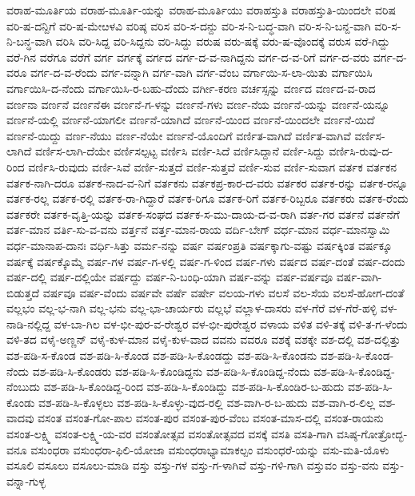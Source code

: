 ವರಾಹ-ಮೂರ್ತಿಯ
ವರಾಹ-ಮೂರ್ತಿ-ಯನ್ನು
ವರಾಹ-ಮೂರ್ತಿಯು
ವರಾಹಸ್ತುತಿ
ವರಾಹಸ್ತುತಿ-ಯಿಂದಲೇ
ವರಿಷ
ವರಿ-ಷ-ದನ್ದಿಗೆ
ವರಿ-ಷ-ಮೇೞಳವಿ
ವರಿಷ್ಠ
ವರಿಸ
ವರಿ-ಸ-ದನ್ದು
ವರಿ-ಸ-ನಿ-ಬದ್ಧ-ವಾಗಿ
ವರಿ-ಸ-ನಿ-ಬನ್ದ-ವಾಗಿ
ವರಿ-ಸ-ನಿ-ಬನ್ಧ-ವಾಗಿ
ವರಿಸಿ
ವರಿ-ಸಿದ್ದ
ವರಿ-ಸಿದ್ದನು
ವರಿ-ಸಿದ್ದು
ವರುಷ
ವರು-ಷಕ್ಕೆ
ವರು-ಷ-ವೊಂದಕ್ಕೆ
ವರುಸ
ವರೆ-ಗಿದ್ದು
ವರೆ-ಗಿನ
ವರೆಗೂ
ವರೆಗೆ
ವರ್ಗ
ವರ್ಗಕ್ಕೆ
ವರ್ಗದ
ವರ್ಗ-ದ-ವ-ನಾಗಿದ್ದನು
ವರ್ಗ-ದ-ವ-ರಿಗೆ
ವರ್ಗ-ದ-ವರು
ವರ್ಗ-ದ-ವರೂ
ವರ್ಗ-ದ-ವ-ರೆಂದು
ವರ್ಗ-ವನ್ನಾಗಿ
ವರ್ಗ-ವಾಗಿ
ವರ್ಗ-ವೆಂಬ
ವರ್ಗಾಯಿ-ಸ-ಲಾ-ಯಿತು
ವರ್ಗಾಯಿಸಿ
ವರ್ಗಾಯಿಸಿ-ದ-ನೆಂದು
ವರ್ಗಾಯಿಸಿ-ರ-ಬಹು-ದೆಂದು
ವರ್ಗೀ-ಕರಣ
ವರ್ಚಸ್ಸನ್ನು
ವರ್ಣದ
ವರ್ಣದ-ವ-ರಾದ
ವರ್ಣನಾ
ವರ್ಣನೆ
ವರ್ಣನೆಈ
ವರ್ಣನೆ-ಗ-ಳನ್ನು
ವರ್ಣನೆ-ಗಳು
ವರ್ಣ-ನೆಯ
ವರ್ಣನೆ-ಯನ್ನು
ವರ್ಣನೆ-ಯನ್ನೂ
ವರ್ಣನೆ-ಯಲ್ಲಿ
ವರ್ಣನೆ-ಯಾಗಲೀ
ವರ್ಣನೆ-ಯಾಗಿದೆ
ವರ್ಣನೆ-ಯಿಂದ
ವರ್ಣನೆ-ಯಿಂದಲೇ
ವರ್ಣನೆ-ಯಿದೆ
ವರ್ಣನೆ-ಯಿದ್ದು
ವರ್ಣ-ನೆಯು
ವರ್ಣ-ನೆಯೇ
ವರ್ಣನೆ-ಯೊಂದಿಗೆ
ವರ್ಣಿತ-ವಾಗಿದೆ
ವರ್ಣಿತ-ವಾಗಿವೆ
ವರ್ಣಿಸ-ಲಾಗಿದೆ
ವರ್ಣಿಸ-ಲಾಗಿ-ದೆಯೇ
ವರ್ಣಿಸಲ್ಪಟ್ಟ
ವರ್ಣಿಸಿ
ವರ್ಣಿ-ಸಿದೆ
ವರ್ಣಿಸಿದ್ದಾನೆ
ವರ್ಣಿ-ಸಿದ್ದು
ವರ್ಣಿಸಿ-ರುವು-ದ-ರಿಂದ
ವರ್ಣಿಸಿ-ರುವುದು
ವರ್ಣಿ-ಸಿವೆ
ವರ್ಣಿ-ಸುತ್ತದೆ
ವರ್ಣಿ-ಸುತ್ತವೆ
ವರ್ಣಿ-ಸುವ
ವರ್ಣಿ-ಸುವಾಗ
ವರ್ತಕ
ವರ್ತಕನ
ವರ್ತಕ-ನಾಗಿ-ದರೂ
ವರ್ತಕ-ನಾದ-ವ-ನಿಗೆ
ವರ್ತಕನು
ವರ್ತಕಪ್ರ-ಕಾರ-ದ-ವರು
ವರ್ತಕರ
ವರ್ತಕ-ರನ್ನು
ವರ್ತಕ-ರನ್ನೂ
ವರ್ತಕ-ರಲ್ಲ
ವರ್ತಕ-ರಲ್ಲಿ
ವರ್ತಕ-ರಾ-ಗಿದ್ದಾರೆ
ವರ್ತಕ-ರಿಗೂ
ವರ್ತಕ-ರಿಗೆ
ವರ್ತಕ-ರಿಬ್ಬರೂ
ವರ್ತಕರು
ವರ್ತಕ-ರೆಂದು
ವರ್ತಕರೇ
ವರ್ತಕ-ವೃತ್ತಿ-ಯನ್ನು
ವರ್ತಕ-ಸಂಘದ
ವರ್ತಕ-ಸ-ಮು-ದಾಯ-ದ-ವ-ರಾಗಿ
ವರ್ತ-ಗರ
ವರ್ತನೆ
ವರ್ತನೆಗೆ
ವರ್ತ-ಮಾನ
ವರ್ತಿ-ಸು-ವ-ವನು
ವರ್ತ್ತನೆ
ವರ್ತ್ತ-ಮಾನ-ರಾಯ
ವರ್ದಿ-ಬೇಗ್
ವರ್ಧ-ಮಾನ
ವರ್ಧ-ಮಾನಸ್ವಾಮಿ
ವರ್ಧ-ಮಾನಾಪ-ದಾನಃ
ವರ್ಧಿ-ಸಿತ್ತು
ವರ್ಮ-ನನ್ನು
ವರ್ಷ
ವರ್ಷಂಪ್ರತಿ
ವರ್ಷಕ್ಕಾಗು-ವಷ್ಟು
ವರ್ಷಕ್ಕಿಂತ
ವರ್ಷಕ್ಕೂ
ವರ್ಷಕ್ಕೆ
ವರ್ಷಕ್ಕೊಮ್ಮೆ
ವರ್ಷ-ಗಳ
ವರ್ಷ-ಗ-ಳಲ್ಲಿ
ವರ್ಷ-ಗ-ಳಿಂದ
ವರ್ಷ-ಗಳು
ವರ್ಷದ
ವರ್ಷ-ದಂತೆ
ವರ್ಷ-ದಂದು
ವರ್ಷ-ದಲ್ಲಿ
ವರ್ಷ-ದಲ್ಲಿಯೇ
ವರ್ಷದ್ದು
ವರ್ಷ-ನಿ-ಬಂಧಿ-ಯಾಗಿ
ವರ್ಷ-ವನ್ನು
ವರ್ಷ-ವರ್ಷವೂ
ವರ್ಷ-ವಾಗಿ-ಬಿಡುತ್ತದೆ
ವರ್ಷವೂ
ವರ್ಷ-ವೆಂದು
ವರ್ಷವೇ
ವರ್ಷೆ
ವರ್ಷೇ
ವಲಯ-ಗಳು
ವಲಸೆ
ವಲ-ಸೆಯ
ವಲಸೆ-ಹೋಗ-ದಂತೆ
ವಲ್ಲಭಂ
ವಲ್ಲ-ಭ-ನಾಗಿ
ವಲ್ಲ-ಭನು
ವಲ್ಲ-ಭಾ-ಚಾರ್ಯರು
ವಲ್ಲಭೆ
ವಲ್ಲಾಳ-ದಾಸರು
ವಳ-ಗೆರೆ
ವಳ-ಗೆರೆ-ಹಳ್ಳಿ
ವಳ-ನಾಡಿ-ನಲ್ಲಿದ್ದ
ವಳ-ಬಾ-ಗಿಲ
ವಳ-ಭೀ-ಪುರ-ವ-ರೇಶ್ವರ
ವಳ-ಭೀ-ಪುರೇಶ್ವರ
ವಳಾಯ
ವಳಿತ
ವಳಿ-ತಕ್ಕೆ
ವಳಿ-ತ-ಗ-ಳೆಂದು
ವಳಿ-ತದ
ವಳೈ-ಅಣ್ಣನ್
ವಳೈ-ಕುಳ-ಮಾನ
ವಳೈ-ಕುಳ-ವಾದ
ವವನು
ವವರೂ
ವಶಕ್ಕೆ
ವಶಕ್ಕೇ
ವಶ-ದಲ್ಲಿ
ವಶ-ದಲ್ಲಿತ್ತು
ವಶ-ಪಡಿ-ಸ-ಕೊಂಡ
ವಶ-ಪಡಿ-ಸಿ-ಕೊಂಡ
ವಶ-ಪಡಿ-ಸಿ-ಕೊಂಡದ್ದು
ವಶ-ಪಡಿ-ಸಿ-ಕೊಂಡನು
ವಶ-ಪಡಿ-ಸಿ-ಕೊಂಡ-ನೆಂದು
ವಶ-ಪಡಿ-ಸಿ-ಕೊಂಡರು
ವಶ-ಪಡಿ-ಸಿ-ಕೊಂಡಿದ್ದನು
ವಶ-ಪಡಿ-ಸಿ-ಕೊಂಡಿದ್ದ-ನೆಂದು
ವಶ-ಪಡಿ-ಸಿ-ಕೊಂಡಿದ್ದ-ನೆಂಬುದು
ವಶ-ಪಡಿ-ಸಿ-ಕೊಂಡಿದ್ದ-ರಿಂದ
ವಶ-ಪಡಿ-ಸಿ-ಕೊಂಡಿದ್ದು
ವಶ-ಪಡಿ-ಸಿ-ಕೊಂಡಿರ-ಬ-ಹುದು
ವಶ-ಪಡಿ-ಸಿ-ಕೊಂಡು
ವಶ-ಪಡಿ-ಸಿ-ಕೊಳ್ಳಲು
ವಶ-ಪಡಿ-ಸಿ-ಕೊಳ್ಳು-ವುದ-ರಲ್ಲಿ
ವಶ-ವಾಗಿ-ರ-ಬ-ಹುದು
ವಶ-ವಾಗಿ-ರ-ಲಿಲ್ಲ
ವಶ-ವಾದವು
ವಸಂತ
ವಸಂತ-ಗೋ-ಪಾಲ
ವಸಂತ-ಪುರ
ವಸಂತ-ಪುರ-ವೆಂಬ
ವಸಂತ-ಮಾಸ-ದಲ್ಲಿ
ವಸಂತ-ರಾಯನು
ವಸಂತ-ಲಕ್ಷ್ಮಿ
ವಸಂತ-ಲಕ್ಷ್ಮಿ-ಯ-ವರ
ವಸಂತೋತ್ಸವ
ವಸಂತೋತ್ಸವದ
ವಸಕ್ಕೆ
ವಸತಿ
ವಸತಿ-ಗಾಗಿ
ವಸಿಷ್ಠ-ಗೋತ್ರೋದ್ಭ-ವನೂ
ವಸುಂಧರಾ
ವಸುಂಧರಾ-ಫಿಲಿ-ಯೋಜಾ
ವಸುಂಧರಾಭ್ಯಾಮಾಕಲ್ಪಂ
ವಸುಂಧರೆ-ಯನ್ನು
ವಸು-ಮತಿ-ಯೊಳು
ವಸೂಲಿ
ವಸೂಲು
ವಸೂಲು-ಮಾಡಿ
ವಸ್ತು
ವಸ್ತು-ಗಳ
ವಸ್ತು-ಗ-ಳಾಗಿವೆ
ವಸ್ತು-ಗಳಿ-ಗಾಗಿ
ವಸ್ತುವಂ
ವಸ್ತು-ವನು
ವಸ್ತು-ವನ್ನಾ-ಗುಳ್ಳ
